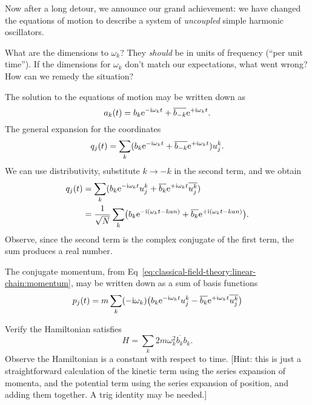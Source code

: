 Now after a long detour, we announce our grand achievement: we have
changed the equations of motion to describe a system of \emph{uncoupled}
simple harmonic oscillators.

\begin{exercise}
What are the dimensions to $\omega_{k}$? They \emph{should} be in units
of frequency (``per unit time''). If the dimensions for $\omega_{k}$
don't match our expectations, what went wrong? How can we remedy the
situation?
\end{exercise}

The solution to the equations of motion may be written down as
\begin{equation}
a_{k}(t) = b_{k}\mathrm{e}^{-\mathrm{i}\omega_{k}t} + \overline{b_{-k}}\mathrm{e}^{+\mathrm{i}\omega_{k}t}.
\end{equation}
The general expansion for the coordinates
\begin{equation}
q_{j}(t) = \sum_{k}(b_{k}\mathrm{e}^{-\mathrm{i}\omega_{k}t} + \overline{b_{-k}}\mathrm{e}^{+\mathrm{i}\omega_{k}t})u^{k}_{j}.
\end{equation}
We can use distributivity, substitute $k\to-k$ in the second term, and
we obtain
\begin{equation}
  \begin{split}
q_{j}(t) &= \sum_{k}(b_{k}\mathrm{e}^{-\mathrm{i}\omega_{k}t}u^{k}_{j} +\overline{b_{k}}\mathrm{e}^{+\mathrm{i}\omega_{k}t}\overline{u^{k}_{j}})\\
&=\frac{1}{\sqrt{N}}\sum_{k}\bigl(b_{k}\mathrm{e}^{-\mathrm{i}(\omega_{k}t-kan)}
+\overline{b_{k}}\mathrm{e}^{+\mathrm{i}(\omega_{k}t-kan)}\bigr).
  \end{split}
\end{equation}
Observe, since the second term is the complex conjugate of the first
term, the sum produces a real number.

The conjugate momentum, from Eq~\eqref{eq:classical-field-theory:linear-chain:momentum},
may be written down as a sum of basis functions
\begin{equation}
p_{j}(t) = m\sum_{k}(-\mathrm{i}\omega_{k})\bigl(b_{k}\mathrm{e}^{-\mathrm{i}\omega_{k}t}u^{k}_{j} - \overline{b_{k}}\mathrm{e}^{+\mathrm{i}\omega_{k}t}\overline{u^{k}_{j}}\bigr)
\end{equation}

\begin{exercise}
Verify the Hamiltonian satisfies
\begin{equation}
H = \sum_{k}2m\omega_{k}^{2}\overline{b_{k}}b_{k}.
\end{equation}
Observe the Hamiltonian is a constant with respect to time.
[Hint: this is just a straightforward calculation of the kinetic term
  using the series expansion of momenta, and the potential term using
  the series expansion of position, and adding them together. A trig
  identity may be needed.]
\end{exercise}


